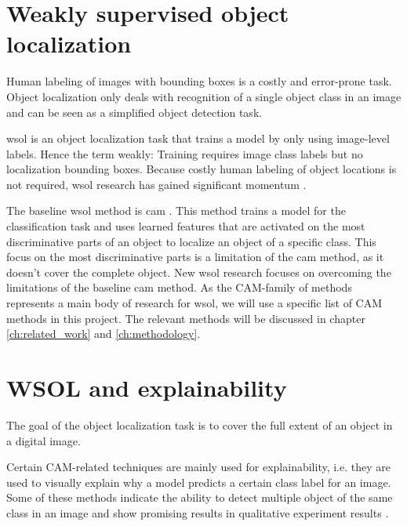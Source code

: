 
\section{Weakly supervised object localization}
Human labeling of images with bounding boxes is a costly and error-prone task. Object localization only deals with recognition of a single object class in an image and can be seen as a simplified object detection task. 

\acrshort{wsol} is an object localization task that trains a model by only using image-level labels. Hence the term weakly: Training requires image class labels but no localization bounding boxes. Because costly human labeling of object locations is not required, \acrshort{wsol} research has gained significant momentum \cite{zhou2016cvpr, selvaraju2017grad, chattopadhay2018grad, wang2021minmaxcam, wang2020score, choe2020evaluating}.

The baseline \acrshort{wsol} method is \acrfull{cam} \cite{zhou2016cvpr}. This method trains a model for the classification task and uses learned features that are activated on the most discriminative parts of an object to localize an object of a specific class. This focus on the most discriminative parts is a limitation of the \acrshort{cam} method, as it doesn't cover the complete object. New \acrshort{wsol} research \cite{selvaraju2017grad, chattopadhay2018grad, wang2021minmaxcam, wang2020score, choe2020evaluating} focuses on overcoming the limitations of the baseline \acrshort{cam} method. As the CAM-family of methods represents a main body of research for \acrlong{wsol}, we will use a specific list of CAM methods in this project. The relevant methods will be discussed in chapter \ref{ch:related_work} and \ref{ch:methodology}. 

\section{WSOL and explainability}

The goal of the object localization task is to cover the full extent of an object in a digital image.

Certain CAM-related techniques are mainly used for explainability, i.e. they are used to visually explain why a model predicts a certain class label for an image. Some of these methods indicate the ability to detect multiple object of the same class in an image and show promising results in qualitative experiment results \cite{wang2020score}.

